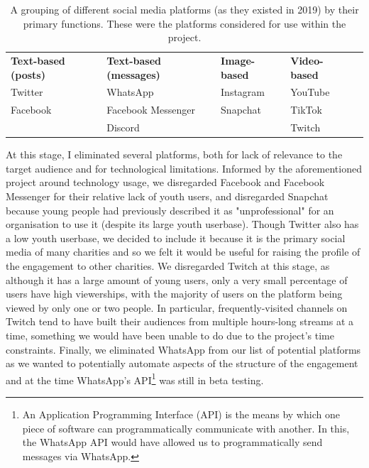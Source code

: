 \begin{table}[hbt!]
\begin{tabular}{lllll}
\caption{A grouping of different social media platforms (as they existed in 2019) by their primary functions. These were the platforms considered for use within the project.}
\label{table:iof-social-media}
\textbf{Text-based (posts)} & \textbf{Text-based (messages)} & \textbf{Image-based} & \textbf{Video-based} &  \\
Twitter                     & WhatsApp                       & Instagram            & YouTube              &  \\
Facebook                    & Facebook Messenger             & Snapchat             & TikTok               &  \\
                            & Discord                        &                      & Twitch               &
\end{tabular}
\end{table}
At this stage, I eliminated several platforms, both for lack of relevance to the target audience and for technological limitations. Informed by the aforementioned project around technology usage, we disregarded Facebook and Facebook Messenger for their relative lack of youth users, and disregarded Snapchat because young people had previously described it as "unprofessional" for an organisation to use it (despite its large youth userbase). Though Twitter also has a low youth userbase, we decided to include it because it is the primary social media of many charities and so we felt it would be useful for raising the profile of the engagement to other charities. We disregarded Twitch at this stage, as although it has a large amount of young users, only a very small percentage of users have high viewerships, with the majority of users on the platform being viewed by only one or two people. In particular, frequently-visited channels on Twitch tend to have built their audiences from multiple hours-long streams at a time, something we would have been unable to do due to the project's time constraints. Finally, we eliminated WhatsApp from our list of potential platforms as we wanted to potentially automate aspects of the structure of the engagement and at the time WhatsApp’s API\footnote{An Application Programming Interface (API) is the means by which one piece of software can programmatically communicate with another. In this, the WhatsApp API would have allowed us to programmatically send messages via WhatsApp.} was still in beta testing. 

